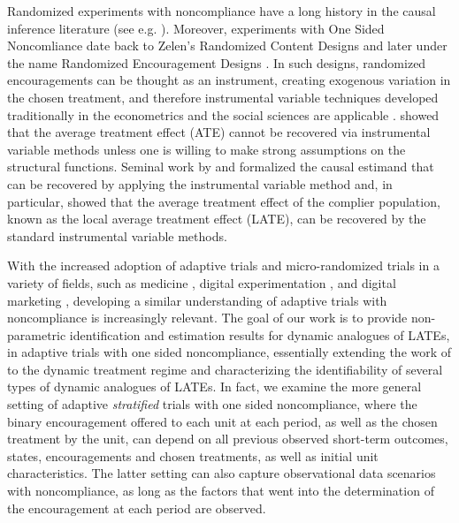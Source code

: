 Randomized experiments with noncompliance have a long history in the causal inference literature (see e.g. \citep[Chapters 23-24]{imbens2015causal}).
Moreover, experiments with One Sided Noncomliance date back to Zelen's Randomized Content Designs \citep{Zelen1979,zelen1990randomized} and later under the name Randomized Encouragement Designs \citep{powers1984effects,holland1988causal,bloom1984accounting}.
In such designs, randomized encouragements can be thought as an instrument, creating exogenous variation in the chosen treatment, and therefore instrumental variable techniques developed traditionally in the econometrics and the social sciences are applicable \citep{Wright1921CorrelationAndCausation,wright1934method,haavelmo1944probability}.
\cite{heckman1990varieties} showed that the average treatment effect (ATE) cannot be recovered via instrumental variable methods unless one is willing to make strong assumptions on the structural functions.
Seminal work by \cite{imbens1994identification} and \cite{angrist1996identification} formalized the causal estimand that can be recovered by applying the instrumental variable method and, in particular, showed that the average treatment effect of the complier population, known as the local average treatment effect (LATE), can be recovered by the standard instrumental variable methods. 

With the increased adoption of adaptive trials and micro-randomized trials \citep{klasnja2015microrandomized} in a variety of fields, such as medicine \citep{bhatt2016adaptive,berry2012adaptive,pallmann2018adaptive}, digital experimentation \citep{agarwal2016multiworld}, and digital marketing \citep{kalyanam2007adaptive}, developing a similar understanding of adaptive trials with noncompliance is increasingly relevant. The goal of our work is to provide non-parametric identification and estimation results for dynamic analogues of LATEs, in adaptive trials with one sided noncompliance, essentially extending the work of \cite{angrist1996identification} to the dynamic treatment regime and characterizing the identifiability of several types of dynamic analogues of LATEs. In fact, we examine the more general setting of adaptive \emph{stratified} trials with one sided noncompliance, where the binary encouragement offered to each unit at each period, as well as the chosen treatment by the unit, can depend on all previous observed short-term outcomes, states, encouragements and chosen treatments, as well as initial unit characteristics. The latter setting can also capture observational data scenarios with noncompliance, as long as the factors that went into the determination of the encouragement at each period are observed.

